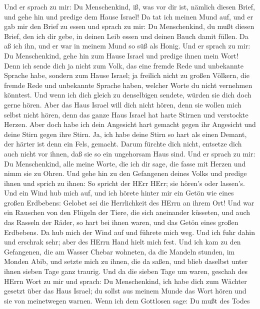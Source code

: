  Und er sprach zu mir: Du Menschenkind, iß, was vor dir ist,
nämlich diesen Brief, und gehe hin und predige dem Hause Israel!
 Da tat ich meinen Mund auf, und er gab mir den Brief zu
essen  und sprach zu mir: Du Menschenkind, du mußt diesen
Brief, den ich dir gebe, in deinen Leib essen und deinen Bauch damit
füllen. Da aß ich ihn, und er war in meinem Mund so süß als Honig.
 Und er sprach zu mir: Du Menschenkind, gehe hin zum Hause
Israel und predige ihnen mein Wort!  Denn ich sende dich ja
nicht zum Volk, das eine fremde Rede und unbekannte Sprache habe,
sondern zum Hause Israel;  ja freilich nicht zu großen
Völkern, die fremde Rede und unbekannte Sprache haben, welcher Worte du
nicht vernehmen könntest. Und wenn ich dich gleich zu denselbigen
sendete, würden sie dich doch gerne hören.  Aber das Haus
Israel will dich nicht hören, denn sie wollen mich selbst nicht hören,
denn das ganze Haus Israel hat harte Stirnen und verstockte Herzen.
 Aber doch habe ich dein Angesicht hart gemacht gegen ihr
Angesicht und deine Stirn gegen ihre Stirn.  Ja, ich habe
deine Stirn so hart als einen Demant, der härter ist denn ein Fels,
gemacht. Darum fürchte dich nicht, entsetze dich auch nicht vor ihnen,
daß sie so ein ungehorsam Haus sind.  Und er sprach zu mir:
Du Menschenkind, alle meine Worte, die ich dir sage, die fasse mit
Herzen und nimm sie zu Ohren.  Und gehe hin zu den
Gefangenen deines Volks und predige ihnen und sprich zu ihnen: So
spricht der HErr HErr; sie hören's oder lassen's.  Und ein
Wind hub mich auf, und ich hörete hinter mir ein Getön wie eines großen
Erdbebens: Gelobet sei die Herrlichkeit des HErrn an ihrem Ort!
 Und war ein Rauschen von den Flügeln der Tiere, die sich
aneinander küsseten, und auch das Rasseln der Räder, so hart bei ihnen
waren, und das Getön eines großen Erdbebens.  Da hub mich
der Wind auf und führete mich weg. Und ich fuhr dahin und erschrak sehr;
aber des HErrn Hand hielt mich fest.  Und ich kam zu den
Gefangenen, die am Wasser Chebar wohneten, da die Mandeln stunden, im
Monden Abib, und setzte mich zu ihnen, die da saßen, und blieb daselbst
unter ihnen sieben Tage ganz traurig.  Und da die sieben
Tage um waren, geschah des HErrn Wort zu mir und sprach: 
Du Menschenkind, ich habe dich zum Wächter gesetzt über das Haus Israel;
du sollst aus meinem Munde das Wort hören und sie von meinetwegen
warnen.  Wenn ich dem Gottlosen sage: Du mußt des Todes
